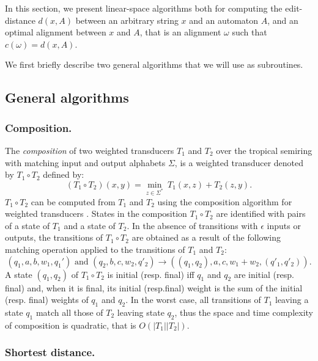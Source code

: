 \documentclass{llncs}
\newcommand{\0}{\overline{0}}
\newcommand{\1}{\overline{1}}
\newcommand{\e}{\epsilon}
\newcommand{\+}{\oplus}
\renewcommand{\.}{\otimes}
\begin{document}
In this section, we present linear-space algorithms both for computing
the edit-distance $d(x, A)$ between an arbitrary string $x$ and an
automaton $A$, and an optimal alignment between $x$ and $A$, that is
an alignment $\omega$ such that $c(\omega) = d(x, A)$.

We first briefly describe two general algorithms that we will use as
subroutines.

\subsection{General algorithms}

\subsubsection{Composition.}
\label{sec:composition}

The {\em composition} of two weighted transducers $T_1$ and $T_2$ over
the tropical semiring with matching input and output alphabets
$\Sigma$, is a weighted transducer denoted by $T_1 \circ
T_2$ defined by:
\begin{equation}
(T_1 \circ T_2)(x, y) = \min_{z \in \Sigma^*}\ T_1(x,z) + T_2(z, y).
\end{equation}
$T_1 \circ T_2$ can be computed from $T_1$ and $T_2$ using the
composition algorithm for weighted transducers
\cite{pereira-riley,ecai}. States in the composition $T_1 \circ T_2$
are identified with pairs of a state of $T_1$ and a state of $T_2$. In
the absence of transitions with $\e$ inputs or outputs, the
transitions of $T_1 \circ T_2$ are obtained as a result of the
following matching operation applied to the transitions of $T_1$ and
$T_2$:
\begin{equation}
(q_1, a, b, w_1, q_1') \mbox{ and } (q_2, b, c, w_2, q'_2)
\to ((q_1,q_2), a, c, w_1 + w_2, (q'_1,q'_2)).
\end{equation}
A state $(q_1,q_2)$ of $T_1 \circ T_2$ is initial (resp. final) iff
$q_1$ and $q_2$ are initial (resp. final) and, when it is final, its
initial (resp.final) weight is the sum of the initial (resp. final)
weights of $q_1$ and $q_2$. In the worst case, all transitions of
$T_1$ leaving a state $q_1$ match all those of $T_2$ leaving state
$q_2$, thus the space and time complexity of composition is quadratic,
that is $O(|T_1||T_2|)$.

\subsubsection{Shortest distance.}
\label{sec:sd}
\end{document}
